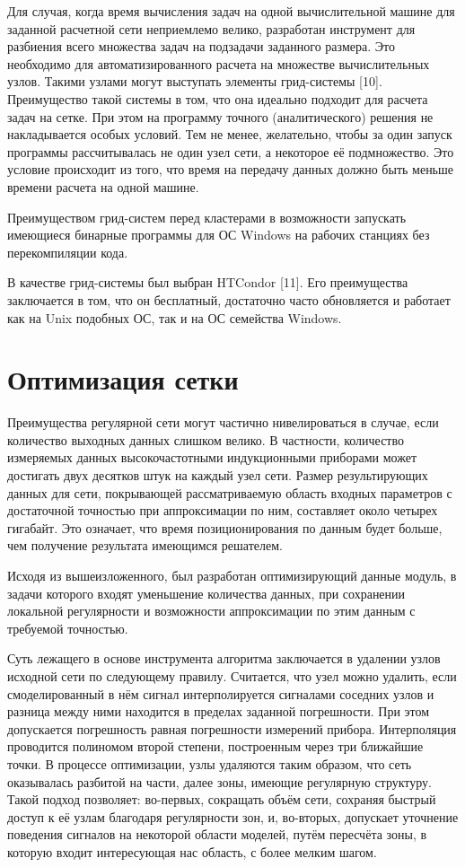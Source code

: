Для случая, когда время вычисления задач на одной вычислительной машине для
заданной расчетной сети неприемлемо велико, разработан инструмент для
разбиения всего множества задач на подзадачи заданного размера. Это
необходимо для автоматизированного расчета на множестве вычислительных
узлов. Такими узлами могут выступать элементы грид-системы [10].
Преимущество такой системы в том, что она идеально подходит для расчета
задач на сетке. При этом на программу точного (аналитического) решения не
накладывается особых условий. Тем не менее, желательно, чтобы за один
запуск программы рассчитывалась не один узел сети, а некоторое её
подмножество. Это условие происходит из того, что время на передачу данных
должно быть меньше времени расчета на одной машине.

Преимуществом грид-систем перед кластерами в возможности запускать
имеющиеся бинарные программы для ОС Windows на рабочих станциях без
перекомпиляции кода.

В качестве грид-системы был выбран HTCondor [11]. Его преимущества
заключается в том, что он бесплатный, достаточно часто обновляется и
работает как на Unix подобных ОС, так и на ОС семейства Windows.

\section{Оптимизация сетки} \label{sect2_3}

Преимущества регулярной сети могут частично нивелироваться в случае, если
количество выходных данных слишком велико. В частности, количество
измеряемых данных высокочастотными индукционными приборами может достигать
двух десятков штук на каждый узел сети. Размер результирующих данных для
сети, покрывающей рассматриваемую область входных параметров с достаточной
точностью при аппроксимации по ним, составляет около четырех гигабайт. Это
означает, что время позиционирования по данным будет больше, чем получение
результата имеющимся решателем.

Исходя из вышеизложенного, был разработан оптимизирующий данные модуль, в
задачи которого входят уменьшение количества данных, при сохранении
локальной регулярности и возможности аппроксимации по этим данным с
требуемой точностью.

Суть лежащего в основе инструмента алгоритма заключается в удалении узлов
исходной сети по следующему правилу. Считается, что узел можно удалить,
если смоделированный в нём сигнал интерполируется сигналами соседних узлов
и разница между ними находится в пределах заданной погрешности. При этом
допускается погрешность равная погрешности измерений прибора. Интерполяция
проводится полиномом второй степени, построенным через три ближайшие точки.
В процессе оптимизации, узлы удаляются таким образом, что сеть оказывалась
разбитой на части, далее зоны, имеющие регулярную структуру. Такой подход
позволяет: во-первых, сокращать объём сети, сохраняя быстрый доступ к её
узлам благодаря регулярности зон, и, во-вторых, допускает уточнение
поведения сигналов на некоторой области моделей, путём пересчёта зоны, в
которую входит интересующая нас область, с более мелким шагом.

